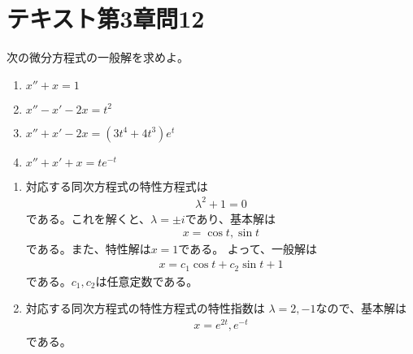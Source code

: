\documentclass[fleqn]{jsarticle}
\begin{document}
\section{テキスト第3章問12}
\begin{shaded}
次の微分方程式の一般解を求めよ。
\begin{enumerate}
\item $x''+x=1$
\item $x''-x'-2x=t^{2}$
\item $x''+x'-2x=(3t^{4}+4t^{3})e^{t}$
\item $x''+x'+x=te^{-t}$
\end{enumerate}
\end{shaded}
\begin{enumerate}
\item 対応する同次方程式の特性方程式は
\begin{eqnarray}
\lambda^{2}+1=0
\end{eqnarray}
である。これを解くと、$\lambda=\pm i$であり、基本解は
\begin{eqnarray}
x=\cos t,\sin t
\end{eqnarray}
である。また、特性解は$x=1$である。
よって、一般解は
\begin{eqnarray}
x=c_{1}\cos t+c_{2}\sin t+1
\end{eqnarray}
である。$c_{1},c_{2}$は任意定数である。
\item 対応する同次方程式の特性方程式の特性指数は
$\lambda=2,-1$なので、基本解は
\begin{eqnarray}
x=e^{2t},e^{-t}
\end{eqnarray}
である。
\end{enumerate}
\end{document}
